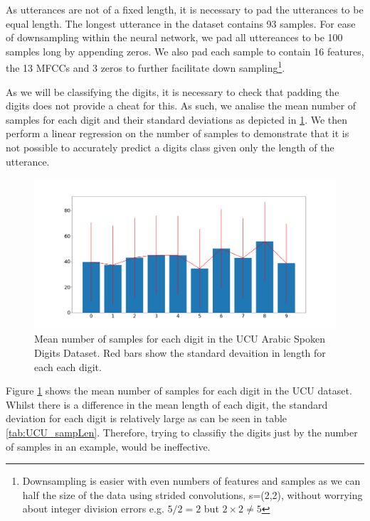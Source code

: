 As utterances are not of a fixed length, it is necessary to pad the utterances to be equal length. The longest utterance in the dataset contains 93 samples. For ease of downsampling within the neural network, we pad all uttereances to be 100 samples long by appending zeros. We also pad each sample to contain 16 features, the 13 MFCCs and 3 zeros to further facilitate down sampling\footnote{Downsampling is easier with even numbers of features and samples as we can half the size of the data using strided convolutions, s=(2,2), without worrying about integer division errors e.g. $5/2=2$ but $2\times2 \neq5$}.

As we will be classifying the digits, it is necessary to check that padding the digits does not provide a cheat for this. As such, we analise the mean number of samples for each digit and their standard deviations as depicted in \ref{fig:ucu_dig_length}. We then perform a linear regression on the number of samples to demonstrate that it is not possible to accurately predict a digits class given only the length of the utterance.

\begin{figure}
	\includegraphics[width=\textwidth]{./Figs/mnistSpoken/UCU_digit_length.png}
	\caption{Mean number of samples for each digit in the UCU Arabic Spoken Digits Dataset. Red bars show the standard devaition in length for each each digit.}
	\label{fig:ucu_dig_length}

\end{figure}

Figure \ref{fig:ucu_dig_length} shows the mean number of samples for each digit in the UCU dataset. Whilst there is a difference in the mean length of each digit, the standard deviation for each digit is relatively large as can be seen in table \ref{tab:UCU_sampLen}. Therefore, trying to classifiy the digits just by the number of samples in an example, would be ineffective.

